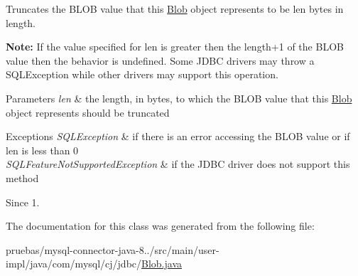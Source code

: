 Truncates the {\ttfamily B\+L\+OB} value that this {\ttfamily \mbox{\hyperlink{classcom_1_1mysql_1_1cj_1_1jdbc_1_1_blob}{Blob}}} object represents to be {\ttfamily len} bytes in length. 

{\bfseries Note\+:} If the value specified for {\ttfamily len} is greater then the length+1 of the {\ttfamily B\+L\+OB} value then the behavior is undefined. Some J\+D\+BC drivers may throw a {\ttfamily S\+Q\+L\+Exception} while other drivers may support this operation.


\begin{DoxyParams}{Parameters}
{\em len} & the length, in bytes, to which the {\ttfamily B\+L\+OB} value that this {\ttfamily \mbox{\hyperlink{classcom_1_1mysql_1_1cj_1_1jdbc_1_1_blob}{Blob}}} object represents should be truncated \\
\hline
\end{DoxyParams}

\begin{DoxyExceptions}{Exceptions}
{\em S\+Q\+L\+Exception} & if there is an error accessing the {\ttfamily B\+L\+OB} value or if len is less than 0 \\
\hline
{\em S\+Q\+L\+Feature\+Not\+Supported\+Exception} & if the J\+D\+BC driver does not support this method \\
\hline
\end{DoxyExceptions}
\begin{DoxySince}{Since}
1. 
\end{DoxySince}


The documentation for this class was generated from the following file\+:\begin{DoxyCompactItemize}
\item 
pruebas/mysql-\/connector-\/java-\/8../src/main/user-\/impl/java/com/mysql/cj/jdbc/\mbox{\hyperlink{_blob_8java}{Blob.\+java}}\end{DoxyCompactItemize}
